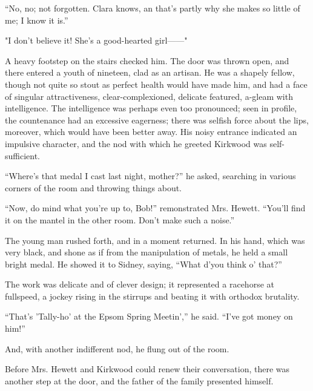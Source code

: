 {\protect\hypertarget{43}{}{}}``No, no; not forgotten. Clara knows, an
that's partly why she makes so little of me; I know it is.''

"I don't believe it! She's a good-hearted girl{{------}}"

A heavy footstep on the stairs checked him. The door was thrown open,
and there entered a youth of nineteen, clad as an artisan. He was a
shapely fellow, though not quite so stout as perfect health would have
made him, and had a face of singular attractiveness, clear-complexioned,
delicate featured, a-gleam with intelligence. The intelligence was
perhaps even too pronounced; seen in profile, the countenance had an
excessive eagerness; there was selfish force about the lips, moreover,
which would have been better away. His noisy entrance indicated an
impulsive character, and the nod with which he greeted Kirkwood was
self-sufficient.

``Where's that medal I cast last night, mother?'' he asked, searching in
various corners of the room and throwing things about.

{\protect\hypertarget{44}{}{}}``Now, do mind what you're up to, Bob!''
remonstrated Mrs. Hewett. ``You'll find it on the mantel in the other
room. Don't make such a noise.''

The young man rushed forth, and in a moment returned. In his hand, which
was very black, and shone as if from the manipulation of metals, he held
a small bright medal. He showed it to Sidney, saying, ``What d'you think
o' that?''

The work was delicate and of clever design; it represented a racehorse
at fullspeed, a jockey rising in the stirrups and beating it with
orthodox brutality.

``That's 'Tally-ho' at the Epsom Spring Meetin','' he said. ``I've got
money on him!''

And, with another indifferent nod, he flung out of the room.

Before Mrs. Hewett and Kirkwood could renew their conversation, there
was another step at the door, and the father of the family presented
himself.
